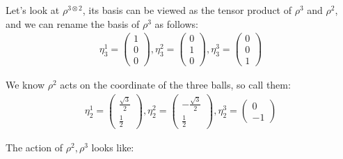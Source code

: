 \documentclass[]{ctexart}
\begin{document}
Let's look at $  \rho^{3\otimes2} $, its basis can be viewed as the tensor product of $\rho^3$ and $\rho ^2$, and we can rename the basis of $\rho^3$ as follows:
	\begin{equation*}
	\begin{aligned}
		\eta_3^1=
		\begin{pmatrix}
			1\\
			0\\
			0
		\end{pmatrix},
		\eta_3^2=
		\begin{pmatrix}
			0\\
			1\\
			0
		\end{pmatrix},
		\eta_3^3=
		\begin{pmatrix}
			0\\
			0\\
			1
		\end{pmatrix}
	\end{aligned}
	\end{equation*}

We know $\rho^2$ acts on the coordinate of the three balls, so call them:
	\begin{equation*}
	\begin{aligned}
		\eta_2^1=
		\begin{pmatrix}
		\frac{\sqrt{3}}{2}\\
		\frac{1}{2}
		\end{pmatrix},
		\eta_2^2=
		\begin{pmatrix}
		-\frac{\sqrt{3}}{2}\\
		\frac{1}{2}
		\end{pmatrix},
		\eta_2^3=
		\begin{pmatrix}
		0\\
		-1
		\end{pmatrix}
	\end{aligned}
	\end{equation*}

The action of $\rho^2,\rho^3$ looks like:
	
\end{document}
